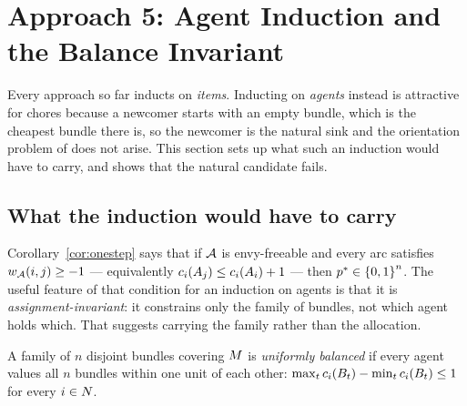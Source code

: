\section{Approach 5: Agent Induction and the Balance Invariant}
\label{sec:approach5}

Every approach so far inducts on \emph{items}. Inducting on \emph{agents}
instead is attractive for chores because a newcomer starts with an empty bundle,
which is the cheapest bundle there is, so the newcomer is the natural sink and
the orientation problem of  does not arise. This section
sets up what such an induction would have to carry, and shows that the natural
candidate fails.

\subsection{What the induction would have to carry}

Corollary~\ref{cor:onestep} says that if $\mathcal{A}$ is envy-freeable and every arc
satisfies $w_{\mathcal{A}}(i,j) \ge -1$ --- equivalently
$c_i(A_{j}) \le c_i(A_{i}) + 1$ --- then
$p^{*} \in \left\{0,1\right\}^n$. The useful feature of that condition for an
induction on agents is that it is \emph{assignment-invariant}: it constrains
only the family of bundles, not which agent holds which. That suggests carrying
the family rather than the allocation.

\begin{definition}
\label{def:unifbal}
A family of $n$ disjoint bundles covering $M$ is \emph{uniformly balanced}
if every agent values all $n$ bundles within one unit of each other:
$\max_t c_i(B_t) - \min_t c_i(B_t) \le 1$ for every $i \in N$.
\end{definition}

